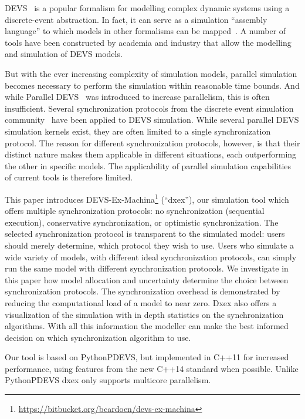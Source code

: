 \textsf{DEVS}~\cite{ClassicDEVS} is a popular formalism for modelling complex dynamic systems using a discrete-event abstraction.
In fact, it can serve as a simulation ``assembly language'' to which models in other formalisms can be mapped~\cite{DEVSbase}.
A number of tools have been constructed by academia and industry that allow the modelling and simulation of \textsf{DEVS} models.

But with the ever increasing complexity of simulation models, parallel simulation becomes necessary to perform the simulation within reasonable time bounds.
And while \textsf{Parallel DEVS}~\cite{ParallelDEVS} was introduced to increase parallelism, this is often insufficient.
Several synchronization protocols from the discrete event simulation community~\cite{FujimotoBook} have been applied to \textsf{DEVS} simulation.
While several parallel \textsf{DEVS} simulation kernels exist, they are often limited to a single synchronization protocol.
The reason for different synchronization protocols, however, is that their distinct nature makes them applicable in different situations, each outperforming the other in specific models.
The applicability of parallel simulation capabilities of current tools is therefore limited.

This paper introduces DEVS-Ex-Machina\footnote{\url{https://bitbucket.org/bcardoen/devs-ex-machina}} (``dxex''), our simulation tool which offers multiple synchronization protocols: no synchronization (sequential execution), conservative synchronization, or optimistic synchronization.
The selected synchronization protocol is transparent to the simulated model: users should merely determine, which protocol they wish to use.
Users who simulate a wide variety of models, with different ideal synchronization protocols, can simply run the same model with different synchronization protocols.
We investigate in this paper how model allocation and uncertainty determine the choice between synchronization protocols. The synchronization overhead is demonstrated by reducing the computational load of a model to near zero. Dxex also offers a visualization of the simulation with in depth statistics on the synchronization algorithms. With all this information the modeller can make the best informed decision on which synchronization algorithm to use.

Our tool is based on PythonPDEVS, but implemented in C++11 for increased performance, using features from the new C++14 standard when possible.
Unlike PythonPDEVS dxex only supports multicore parallelism.

